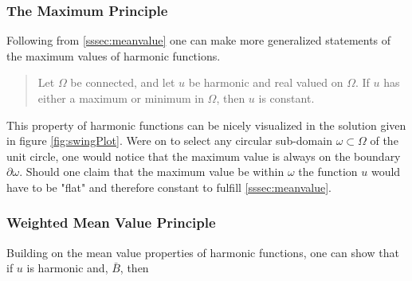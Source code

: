   \subsubsection{The Maximum Principle}\label{sssec:maximum}
  Following from \ref{sssec:meanvalue} one can make more generalized statements of
  the maximum values of harmonic functions.
  \begin{quote}
      Let $\Omega$ be connected, and let $u$ be harmonic and real valued on $\Omega$.
      If $u$ has either a maximum or minimum in $\Omega$, then $u$ is constant.\cite{Axler1992}
  \end{quote}

  This property of harmonic functions can be nicely visualized in the solution given
  in figure \ref{fig:swingPlot}. Were on to select any circular
  sub-domain $\omega \subset \Omega$ of the unit circle, one would notice that the maximum value is always
  on the boundary  $\partial \omega$.  Should one claim that the maximum  value be within $\omega$
  the function $u$ would have to be "flat" and therefore constant to fulfill \ref{sssec:meanvalue}.

  \subsubsection{Weighted Mean Value Principle}%
  Building on the mean value properties of harmonic functions, one can show that if $u$ is harmonic and,
  $\bar{B}$, then

